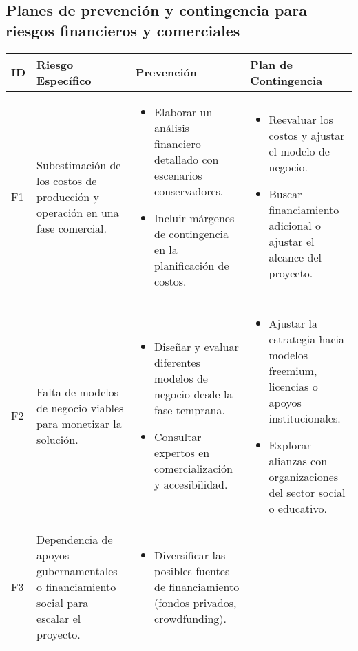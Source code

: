 
\subsection{Planes de prevención y contingencia para riesgos financieros y comerciales}

\begin{longtable}{|>{\centering\arraybackslash}p{0.7cm}|>{\raggedright\arraybackslash}p{4cm}|>{\raggedright\arraybackslash}p{5.5cm}|>{\raggedright\arraybackslash}p{5.5cm}|}
	\hline
	\textbf{ID} & \textbf{Riesgo Específico} & \textbf{Prevención} & \textbf{Plan de Contingencia} \\
	\hline
	F1 & Subestimación de los costos de producción y operación en una fase comercial. &
	\begin{itemize}
		\item Elaborar un análisis financiero detallado con escenarios conservadores.
		\item Incluir márgenes de contingencia en la planificación de costos.
	\end{itemize} &
	\begin{itemize}
		\item Reevaluar los costos y ajustar el modelo de negocio.
		\item Buscar financiamiento adicional o ajustar el alcance del proyecto.
	\end{itemize} \\
	\hline
	F2 & Falta de modelos de negocio viables para monetizar la solución. &
	\begin{itemize}
		\item Diseñar y evaluar diferentes modelos de negocio desde la fase temprana.
		\item Consultar expertos en comercialización y accesibilidad.
	\end{itemize} &
	\begin{itemize}
		\item Ajustar la estrategia hacia modelos freemium, licencias o apoyos institucionales.
		\item Explorar alianzas con organizaciones del sector social o educativo.
	\end{itemize} \\
	\hline
	F3 & Dependencia de apoyos gubernamentales o financiamiento social para escalar el proyecto. &
	\begin{itemize}
		\item Diversificar las posibles fuentes de financiamiento (fondos privados, crowdfunding).

\end{itemize}
\end{longtable}
